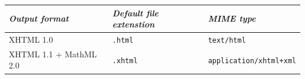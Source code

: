\documentclass[12pt]{article}
\newcommand\textstyleSourceText[1]{\texttt{#1}}
\renewcommand\normalcolor{\color{black}}
\newenvironment{styleTableHeading}{\setlength\leftskip{0cm plus 1fil}\setlength\rightskip{0cm plus 1fil}\setlength\parindent{0cm}\setlength\parfillskip{0pt}\setlength\parskip{0.101cm}\writerlistparindent\writerlistleftskip\leavevmode\normalfont\normalsize\normalcolor\bfseries\itshape\writerlistlabel\ignorespaces}{\unskip\vspace{0.21cm}\par}
\newenvironment{styleTableContents}{\setlength\leftskip{0cm}\setlength\rightskip{0cm}\setlength\parindent{0cm}\setlength\parfillskip{0pt plus 1fil}\setlength\parskip{0.101cm}\writerlistparindent\writerlistleftskip\leavevmode\normalfont\normalsize\normalcolor\writerlistlabel\ignorespaces}{\unskip\vspace{0.21cm}\par}
\newcommand\writerlistleftskip{}
\newcommand\writerlistparindent{}
\newcommand\writerlistlabel{}
\begin{document}
\begin{longtable}[c]{|p{5.467cm}|p{5.467cm}|p{5.467cm}|}
\hline
\begin{minipage}[c]{5.467cm}\begin{styleTableHeading}
Output format
\end{styleTableHeading}
\end{minipage}&
\begin{minipage}[c]{5.467cm}\begin{styleTableHeading}
Default file extenstion
\end{styleTableHeading}
\end{minipage}&
\begin{minipage}[c]{5.467cm}\begin{styleTableHeading}
MIME type
\end{styleTableHeading}
\end{minipage}\\\hline
\endhead
\begin{minipage}[c]{5.467cm}\begin{styleTableContents}
XHTML 1.0
\end{styleTableContents}
\end{minipage}&
\begin{minipage}[c]{5.467cm}\begin{styleTableContents}
\textstyleSourceText{.html}
\end{styleTableContents}
\end{minipage}&
\begin{minipage}[c]{5.467cm}\begin{styleTableContents}
\textstyleSourceText{text/html}
\end{styleTableContents}
\end{minipage}\\\hline
\begin{minipage}[c]{5.467cm}\begin{styleTableContents}
XHTML 1.1 + MathML 2.0
\end{styleTableContents}
\end{minipage}&
\begin{minipage}[c]{5.467cm}\begin{styleTableContents}
\textstyleSourceText{.xhtml}
\end{styleTableContents}
\end{minipage}&
\begin{minipage}[c]{5.467cm}\begin{styleTableContents}
\textstyleSourceText{application/xhtml+xml}
\end{styleTableContents}

\end{minipage}
\end{longtable}
\end{document}
